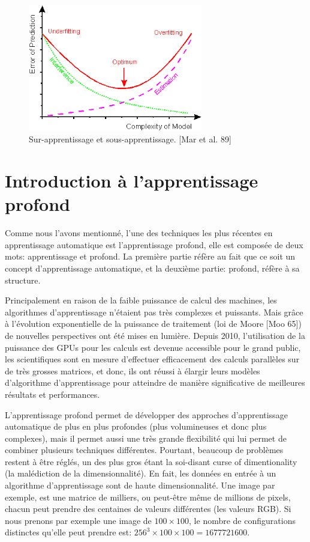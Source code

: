 \begin{figure}[H]
	\centering
		\includegraphics[width=3in]{Figures/image024.png}
	\caption[An Electron]{Sur-apprentissage et sous-apprentissage. [Mar et al. 89]}
	\label{fig:Electron}
\end{figure}


\section{Introduction à l'apprentissage profond}

	Comme nous l'avons mentionné, l'une des techniques les plus récentes en apprentissage automatique est l'apprentissage profond, elle est composée de deux mots: apprentissage et profond. La première partie réfère au fait que ce soit un concept d'apprentissage automatique, et la deuxième partie: profond, réfère à sa structure.

	Principalement en raison de la faible puissance de calcul des machines, les algorithmes d'apprentissage n'étaient pas très complexes et puissants. Mais grâce à l'évolution exponentielle de la puissance de traitement (loi de Moore [Moo 65]) de nouvelles perspectives ont été mises en lumière.
Depuis 2010, l'utilisation de la puissance des GPUs pour les calculs est devenue accessible pour le grand public, les scientifiques sont en mesure d'effectuer efficacement des calculs parallèles sur de très grosses matrices, et donc, ils ont réussi à élargir leurs modèles d'algorithme d'apprentissage pour atteindre de manière significative de meilleures résultats et performances.

	L'apprentissage profond permet de développer des approches d'apprentissage automatique de plus en plus profondes (plus volumineuses et donc plus complexes), mais il permet aussi une très grande flexibilité qui lui permet de combiner plusieurs techniques différentes. Pourtant, beaucoup de problèmes restent à être réglés, un des plus gros étant la soi-disant curse of dimentionality (la malédiction de la dimensionnalité). En fait, les données en entrée à un algorithme d'apprentissage sont de haute dimensionnalité. Une image par exemple, est une matrice de milliers, ou peut-être même de millions de pixels, chacun peut prendre des centaines de valeurs différentes (les valeurs RGB). Si nous prenons par exemple une image de $100 \times 100$, le nombre de configurations distinctes qu'elle peut prendre est:
$256^{3} \times 100 \times 100 = 1 677 721 600$.

